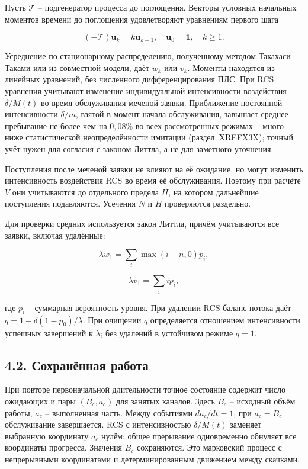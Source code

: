 Пусть \(\mathcal T\) -- подгенератор процесса до поглощения. Векторы условных начальных моментов времени до поглощения удовлетворяют уравнениям первого шага


\[(-\mathcal T)\boldsymbol u_k=k\boldsymbol u_{k-1},\quad
\boldsymbol u_0=\mathbf1,\quad k\ge1.\]


Усреднение по стационарному распределению, полученному методом Такахаси--Таками или из совместной модели, даёт \(w_k\) или \(v_k\). Моменты находятся из линейных уравнений, без численного дифференцирования ПЛС. При RCS уравнения учитывают изменение индивидуальной интенсивности воздействия \(\delta/M(t)\) во время обслуживания меченой заявки. Приближение постоянной интенсивности \(\delta/m\), взятой в момент начала обслуживания, завышает среднее пребывание не более чем на \(0{,}08\%\) во всех рассмотренных режимах -- много ниже статистической неопределённости имитации (раздел~XREFX3X); точный учёт нужен для согласия с законом Литтла, а не для заметного уточнения.

Поступления после меченой заявки не влияют на её ожидание, но могут изменить интенсивность воздействия RCS во время её обслуживания. Поэтому при расчёте \(V\) они учитываются до отдельного предела \(H\), на котором дальнейшие поступления подавляются. Усечения \(N\) и \(H\) проверяются раздельно.

Для проверки средних используется закон Литтла, причём учитываются все заявки, включая удалённые:


\[\lambda w_1=\sum_i\max(i-n,0)p_i,\]

\[\lambda v_1=\sum_i i p_i,\]


где \(p_i\) -- суммарная вероятность уровня. При удалении RCS баланс потока даёт \(q=1-\delta(1-p_0)/\lambda\). При очищении \(q\) определяется отношением интенсивности успешных завершений к \(\lambda\); без удалений в устойчивом режиме \(q=1\).

\subsection*{4.2. Сохранённая работа}
При повторе первоначальной длительности точное состояние содержит число ожидающих и пары \((B_c,a_c)\) для занятых каналов. Здесь \(B_c\) -- исходный объём работы, \(a_c\) -- выполненная часть. Между событиями \(da_c/dt=1\), при \(a_c=B_c\) обслуживание завершается. RCS с интенсивностью \(\delta/M(t)\) заменяет выбранную координату \(a_c\) нулём; общее прерывание одновременно обнуляет все координаты прогресса. Значения \(B_c\) сохраняются. Это марковский процесс с непрерывными координатами и детерминированным движением между скачками.

